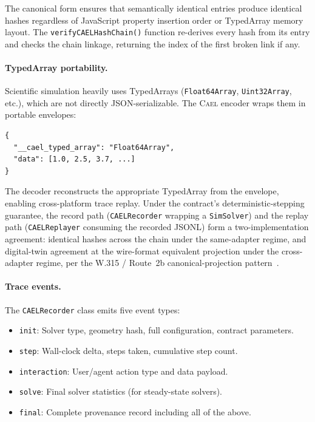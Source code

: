 \documentclass[letterpaper,twocolumn,10pt]{article}
\newcommand{\cael}{\textsc{Cael}}
\begin{document}
The canonical form ensures that semantically identical entries produce
identical hashes regardless of JavaScript property insertion order or
TypedArray memory layout. The \texttt{verifyCAELHashChain()} function
re-derives every hash from its entry and checks the chain linkage,
returning the index of the first broken link if any.

\paragraph{TypedArray portability.} Scientific simulation heavily uses
TypedArrays (\texttt{Float64Array}, \texttt{Uint32Array}, etc.), which
are not directly JSON-serializable. The \cael{} encoder wraps them in
portable envelopes:

\begin{lstlisting}
{
  "__cael_typed_array": "Float64Array",
  "data": [1.0, 2.5, 3.7, ...]
}
\end{lstlisting}

The decoder reconstructs the appropriate TypedArray from the envelope,
enabling cross-platform trace replay. Under the contract's
deterministic-stepping guarantee, the record path
(\texttt{CAELRecorder} wrapping a \texttt{SimSolver}) and the replay
path (\texttt{CAELReplayer} consuming the recorded JSONL) form a
two-implementation agreement: identical hashes across the chain
under the same-adapter regime, and digital-twin agreement at the
wire-format equivalent projection under the cross-adapter regime,
per the W.315 / Route~2b canonical-projection
pattern~\cite{paper-0c-twin-test-2026-05-11}.

\paragraph{Trace events.} The \texttt{CAELRecorder} class emits five
event types:

\begin{itemize}[leftmargin=*,topsep=2pt,itemsep=1pt]
  \item \texttt{init}: Solver type, geometry hash, full configuration,
    contract parameters.
  \item \texttt{step}: Wall-clock delta, steps taken, cumulative step
    count.
  \item \texttt{interaction}: User/agent action type and data payload.
  \item \texttt{solve}: Final solver statistics (for steady-state
    solvers).
  \item \texttt{final}: Complete provenance record including all of
    the above.
\end{itemize}
\end{document}
